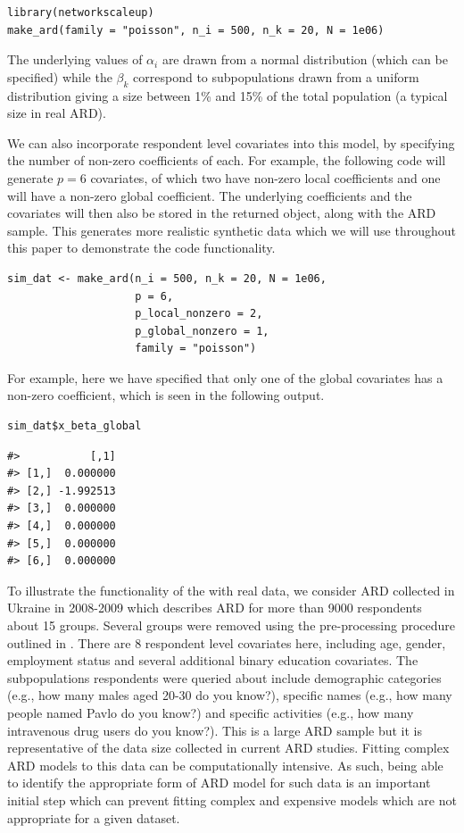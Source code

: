 \begin{verbatim}
library(networkscaleup)
make_ard(family = "poisson", n_i = 500, n_k = 20, N = 1e06)
\end{verbatim}

The underlying values of \(\alpha_i\) are drawn from a normal distribution
(which can be specified) while the \(\beta_k\) correspond to
subpopulations drawn from a uniform distribution giving a size
between 1\% and 15\% of the total population
(a typical size in real ARD).

We can also incorporate respondent level covariates into this
model, by specifying the number of non-zero coefficients of each.
For example, the following code will generate \(p=6\) covariates,
of which two have non-zero local coefficients and one
will have a non-zero global coefficient.
The underlying coefficients and the covariates will then also be stored
in the returned object, along with the ARD sample. This generates
more realistic synthetic data which we will use throughout this paper
to demonstrate the code functionality.

\begin{verbatim}
sim_dat <- make_ard(n_i = 500, n_k = 20, N = 1e06,
                    p = 6,
                    p_local_nonzero = 2,
                    p_global_nonzero = 1,
                    family = "poisson")
\end{verbatim}

For example, here we have specified that only one of the
global covariates has a non-zero coefficient, which is seen
in the following output.

\begin{verbatim}
sim_dat$x_beta_global 
\end{verbatim}

\begin{verbatim}
#>           [,1]
#> [1,]  0.000000
#> [2,] -1.992513
#> [3,]  0.000000
#> [4,]  0.000000
#> [5,]  0.000000
#> [6,]  0.000000
\end{verbatim}

To illustrate the functionality of the 
with real data, we consider ARD collected in Ukraine in 2008-2009
\citep{paniotto2009estimating} which describes ARD for more than 9000 respondents
about 15 groups. Several groups were removed using the
pre-processing procedure outlined in \citet{laga2023correlated}. There
are 8 respondent level covariates here, including age, gender, employment
status and several additional binary education covariates.
The subpopulations respondents were queried about include
demographic categories (e.g., how many males aged 20-30 do you know?),
specific names (e.g., how many
people named Pavlo do you know?)
and specific activities (e.g., how many intravenous drug users do you know?).
This is a large ARD sample but it is representative of the
data size collected in current ARD studies.
Fitting complex ARD models to this data can be computationally
intensive. As such, being able to identify the appropriate form
of ARD model for such data is an important initial step which
can prevent fitting complex and expensive models which are
not appropriate for a given dataset.

